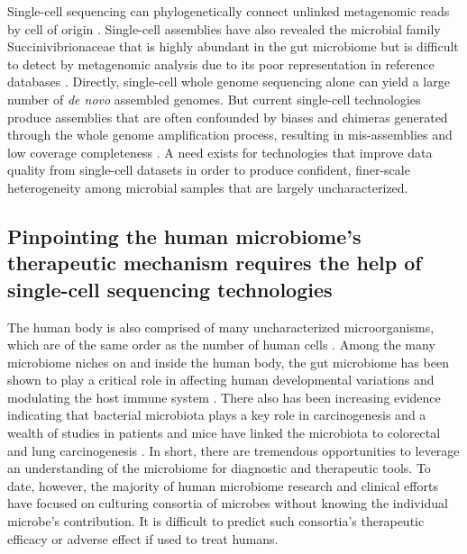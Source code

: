 Single-cell sequencing can phylogenetically connect unlinked metagenomic reads by cell of origin \cite{Rinke:2013bt}. Single-cell assemblies have also revealed the microbial family Succinivibrionaceae that is highly abundant in the gut microbiome but is difficult to detect by metagenomic analysis due to its poor representation in reference databases \cite{Xu:2016wt}. Directly, single-cell whole genome sequencing alone can yield a large number of \textit{de novo} assembled genomes. But current single-cell technologies produce assemblies that are often confounded by biases and chimeras generated through the whole genome amplification process, resulting in mis-assemblies and low coverage completeness \cite{Rodrigue:2009gc,VanderAa:2013jz}. A need exists for technologies that improve data quality from single-cell datasets in order to produce confident, finer-scale heterogeneity among microbial samples that are largely uncharacterized. 

\subsection{Pinpointing the human microbiome's therapeutic mechanism requires the help of single-cell sequencing technologies}
The human body is also comprised of many uncharacterized microorganisms, which are of the same order as the number of human cells \cite{Sender:2016ei}. Among the many microbiome niches on and inside the human body, the gut microbiome has been shown to play a critical role in affecting human developmental variations \cite{Yatsunenko:2012gi} and modulating the host immune system \cite{GevaZatorsky:2017fy}. There also has been increasing evidence indicating that bacterial microbiota plays a key role in carcinogenesis \cite{Plottel:2011io} and a wealth of studies in patients and mice have linked the microbiota to colorectal and lung carcinogenesis \cite{Yoshimoto:2013ff,Uronis:2009es}. In short, there are tremendous opportunities to leverage an understanding of the microbiome for diagnostic and therapeutic tools. To date, however, the majority of human microbiome research and clinical efforts have focused on culturing consortia of microbes without knowing the individual microbe's contribution. It is difficult to predict such consortia's therapeutic efficacy or adverse effect if used to treat humans. 


